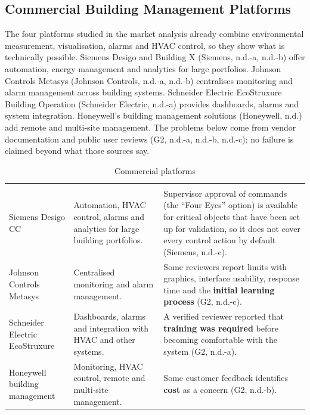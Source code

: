 \documentclass[11pt,a4paper]{article}
\begin{document}
\subsection{Commercial Building Management Platforms}
The four platforms studied in the market analysis already combine environmental measurement, visualisation, alarms and HVAC control, so they show what is technically possible. Siemens Desigo and Building X (Siemens, n.d.-a, n.d.-b) offer automation, energy management and analytics for large portfolios. Johnson Controls Metasys (Johnson Controls, n.d.-a, n.d.-b) centralises monitoring and alarm management across building systems. Schneider Electric EcoStruxure Building Operation (Schneider Electric, n.d.-a) provides dashboards, alarms and system integration. Honeywell's building management solutions (Honeywell, n.d.) add remote and multi-site management. The problems below come from vendor documentation and public user reviews (G2, n.d.-a, n.d.-b, n.d.-c); no failure is claimed beyond what those sources say.

{\small\stripe
\begin{xltabular}{\linewidth}{|L{3.2cm}|L{5.4cm}|Y|}
\caption{Commercial platforms}\label{tab:commercial}\\
\hline\headrow
{} &  & \\\hline
\endfirsthead
\hline\headrow
{} &  & \\\hline
\endhead
Siemens Desigo CC & Automation, HVAC control, alarms and analytics for large building portfolios. & Supervisor approval of commands (the ``Four Eyes'' option) is available for critical objects that have been set up for validation, so it does not cover every control action by default (Siemens, n.d.-c).\\\hline
Johnson Controls Metasys & Centralised monitoring and alarm management. & Some reviewers report limits with graphics, interface usability, response time and the \textbf{initial learning process} (G2, n.d.-c).\\\hline
Schneider Electric EcoStruxure & Dashboards, alarms and integration with HVAC and other systems. & A verified reviewer reported that \textbf{training was required} before becoming comfortable with the system (G2, n.d.-a).\\\hline
Honeywell building management & Monitoring, HVAC control, remote and multi-site management. & Some customer feedback identifies \textbf{cost} as a concern (G2, n.d.-b).\\\hline
\end{xltabular}}
\end{document}
